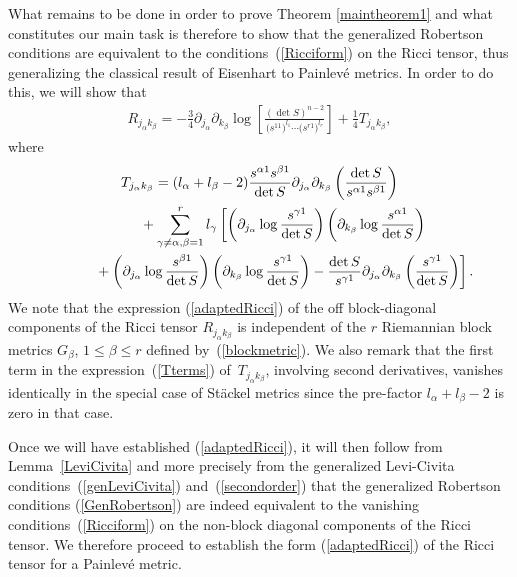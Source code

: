 \documentclass[pdftex]{sigma}
\numberwithin{equation}{section}
\newcommand{\jalpha}{j_{\alpha}}
\newcommand{\kbeta}{k_{\beta}}
\newcommand{\lbeta}{l_{\beta}}
\newcommand{\lalpha}{l_{\alpha}}
\begin{document}
What remains to be done in order to prove Theorem \ref{maintheorem1} and what constitutes our main task is therefore to show that the generalized Robertson conditions are equivalent to the conditions~(\ref{Ricciform}) on the Ricci tensor, thus generalizing the classical result of Eisenhart \cite{Eis1934} to Painlev\'e metrics. In order to do this, we will show that
\begin{gather}\label{adaptedRicci}
R_{\jalpha \kbeta}=-\frac{3}{4}\partial_{j_{\alpha}}\partial_{k_{\beta}}\log\left[\frac{(\det S)^{n-2}}{\big(s^{11}\big)^{l_{1}}\cdots \big(s^{r1}\big)^{l_{r}}}\right] + \frac{1}{4}T_{\jalpha \kbeta},
\end{gather}
where
\begin{gather}
T_{\jalpha \kbeta} =(l_{\alpha}+l_{\beta}-2)\frac{s^{\alpha 1}s^{\beta 1}}{\det S}\partial_{j_{\alpha}}\partial_{k_{\beta}}\left(\frac{\det S}{s^{\alpha 1}s^{\beta 1}}\right)\nonumber\\
\hphantom{T_{\jalpha \kbeta} =}{} +\sum_{\gamma\neq \alpha,\beta=1}^{r}l_{\gamma}\left[\left(\partial_{j_{\alpha}}\log\frac{s^{\gamma 1}}{\det S}\right)\left(\partial_{k_{\beta}}\log\frac{s^{\alpha 1}}{\det S}\right)\right.\nonumber\\
\left.\hphantom{T_{\jalpha \kbeta} =}{}+\left(\partial_{j_{\alpha}}\log\frac{s^{\beta 1}}{\det S}\right)\left(\partial_{k_{\beta}}\log\frac{s^{\gamma 1}}{\det S}\right)
-\frac{\det S}{s^{\gamma 1}}\partial_{j_{\alpha}}\partial_{k_{\beta}}\left(\frac{s^{\gamma 1}}{\det S}\right)\right].\label{Tterms}
\end{gather}
We note that the expression (\ref{adaptedRicci}) of the off block-diagonal components of the Ricci tensor $R_{\jalpha \kbeta}$ is independent of the $r$ Riemannian block metrics $G_{\beta}$, $1\leq \beta \leq r$ defined by~(\ref{blockmetric}). We also remark that the first term in the expression~(\ref{Tterms}) of~$T_{\jalpha \kbeta}$, involving second derivatives, vanishes identically in the special case of St\"ackel metrics since the pre-factor $\lalpha+\lbeta-2$ is zero in that case.

Once we will have established (\ref{adaptedRicci}), it will then follow from Lemma~\ref{LeviCivita} and more precisely from the generalized Levi-Civita conditions~(\ref{genLeviCivita}) and~(\ref{secondorder}) that the generalized Robertson conditions (\ref{GenRobertson}) are indeed equivalent to the vanishing conditions~(\ref{Ricciform}) on the non-block diagonal components of the Ricci tensor. We therefore proceed to establish the form (\ref{adaptedRicci}) of the Ricci tensor for a Painlev\'e metric.
\end{document}
